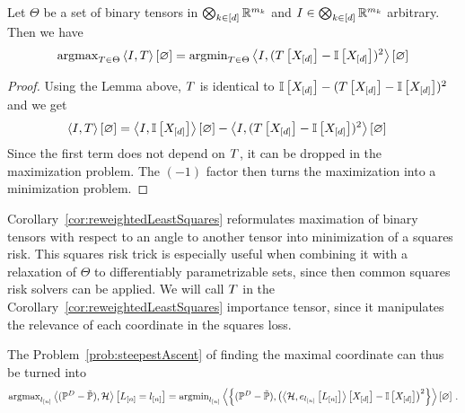 \begin{theorem}\label{the:reweightedLeastSquares}
	Let $\Theta$ be a set of binary tensors in $\bigotimes_{k\in[d]} \mathbb{R}^{m_{k}}$ and $I\in\bigotimes_{k\in[d]} \mathbb{R}^{m_{k}}$ arbitrary.
	Then we have
	\begin{align}
		\mathrm{argmax}_{T\in\Theta} \left\langle I,T\right\rangle \left[ \varnothing \right] 
		= \mathrm{argmin}_{T\in\Theta} \left\langle I, (T\left[X_{[d]}\right]-\mathbb{I}\left[X_{[d]}\right])^2\right\rangle \left[ \varnothing \right]
	\end{align} 
\end{theorem}
\begin{proof}
	Using the Lemma above, $T$ is identical to $\mathbb{I}\left[X_{[d]}\right]-(T\left[X_{[d]}\right]-\mathbb{I}\left[X_{[d]}\right])^2$ and we get
	\begin{align*}
		 \left\langle I,T\right\rangle \left[ \varnothing \right] 
		 &=  \left\langle I,\mathbb{I}\left[X_{[d]}\right]\right\rangle \left[ \varnothing \right]-\left\langle I,(T\left[X_{[d]}\right]-\mathbb{I}\left[X_{[d]}\right])^2\right\rangle \left[ \varnothing \right] 
	\end{align*}
	Since the first term does not depend on $T$, it can be dropped in the maximization problem.
	The $(-1)$ factor then turns the maximization into a minimization problem.
\end{proof}

Corollary~\ref{cor:reweightedLeastSquares} reformulates maximation of binary tensors with respect to an angle to another tensor into minimization of a squares risk.
This squares risk trick is especially useful when combining it with a relaxation of $\Theta$ to differentiably parametrizable sets, since then common squares risk solvers can be applied.
We will call $T$ in the Corollary~\ref{cor:reweightedLeastSquares} importance tensor, since it manipulates the relevance of each coordinate in the squares loss.

\begin{example}
	The Problem~\ref{prob:steepestAscent} of finding the maximal coordinate can thus be turned into
	\begin{align*}
		\mathrm{argmax}_{l_{[n]}} \left\langle (\mathbb{P}^{D}-\tilde{\mathbb{P}}),\mathcal{H}\right\rangle \left[ L_{[n]}=l_{[n]} \right]  
		= \mathrm{argmin}_{l_{[n]}} \left\langle \left\{(\mathbb{P}^{D}-\tilde{\mathbb{P}}),
		\left(\left\langle \mathcal{H},e_{l_{[n]}}\left[L_{[n]}\right]\right\rangle \left[ X_{[d]} \right]-\mathbb{I}\left[X_{[d]}\right]\right)^2\right\}\right\rangle \left[ \varnothing \right] \, . 
	\end{align*}
\end{example}



